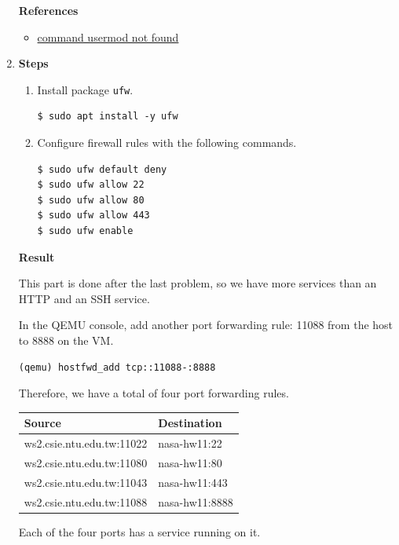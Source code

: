 \documentclass[12pt, a4paper]{article}
\begin{document}
\begin{enumerate}[resume]
    \textbf{References}
    \begin{itemize}
      \item \href{https://www.linuxquestions.org/questions/linux-newbie-8/command-usermod-not-found-385901/}{command usermod not found}
    \end{itemize}

    \item \textbf{Steps}
    \begin{enumerate}[label=(\arabic*)]
      \item Install package \verb|ufw|.
      \begin{Verbatim}[frame=single]
$ sudo apt install -y ufw
      \end{Verbatim}
      \item Configure firewall rules with the following commands.
      \begin{Verbatim}[frame=single]
$ sudo ufw default deny
$ sudo ufw allow 22
$ sudo ufw allow 80
$ sudo ufw allow 443
$ sudo ufw enable
      \end{Verbatim}
    \end{enumerate}

    \textbf{Result}

    This part is done after the last problem, so we have more services than an HTTP
    and an SSH service.

    In the QEMU console, add another port forwarding rule: 11088 from the host to
    8888 on the VM.
    \begin{Verbatim}[frame=single]
(qemu) hostfwd_add tcp::11088-:8888
    \end{Verbatim}

    Therefore, we have a total of four port forwarding rules.

    \begin{tabular}{|ll|}
      \hline
      \textbf{Source} & \textbf{Destination} \\\hline
      ws2.csie.ntu.edu.tw:11022 & nasa-hw11:22 \\
      ws2.csie.ntu.edu.tw:11080 & nasa-hw11:80 \\
      ws2.csie.ntu.edu.tw:11043 & nasa-hw11:443 \\
      ws2.csie.ntu.edu.tw:11088 & nasa-hw11:8888 \\
      \hline
    \end{tabular}

    \vspace{\baselineskip}
    Each of the four ports has a service running on it.


\end{enumerate}
\end{document}
